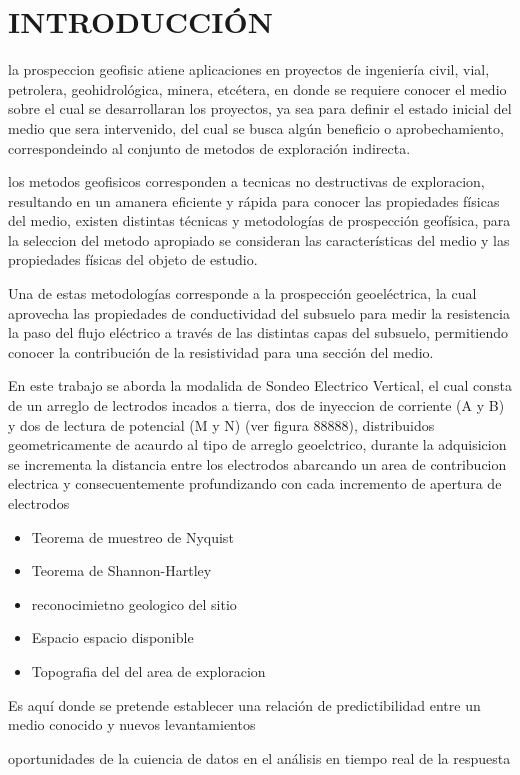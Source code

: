 \chapter{INTRODUCCIÓN}
la prospeccion geofisic atiene aplicaciones en proyectos de ingeniería civil, vial, petrolera, geohidrológica, minera, etcétera, en donde se requiere conocer el medio sobre el cual se desarrollaran los proyectos, ya sea para definir el estado inicial del medio que sera intervenido, del cual se busca algún beneficio o aprobechamiento, correspondeindo al conjunto de metodos  de exploración indirecta.

los metodos geofisicos corresponden a tecnicas no destructivas de exploracion, resultando en un amanera eficiente y rápida para conocer las propiedades físicas del medio, existen distintas técnicas y metodologías de prospección geofísica,  para la seleccion del metodo apropiado se consideran las características del medio y las propiedades físicas del objeto de estudio.

Una de estas metodologías corresponde a la prospección geoeléctrica, la cual aprovecha las propiedades de conductividad del subsuelo para medir la resistencia la paso del flujo eléctrico a través de las distintas capas del subsuelo, permitiendo conocer la contribución de la resistividad para una sección del medio.

En este trabajo se aborda la modalida de Sondeo Electrico Vertical, el cual consta de un arreglo de lectrodos incados a tierra, dos de inyeccion de corriente (A y B) y dos de lectura de potencial (M y N) (ver figura 88888), distribuidos geometricamente de acaurdo al tipo de arreglo geoelctrico, durante la adquisicion se incrementa la distancia entre los electrodos abarcando un area de contribucion electrica y consecuentemente profundizando con cada incremento de apertura de electrodos



\begin{itemize}
	\item Teorema de muestreo de Nyquist
	\item Teorema de Shannon-Hartley
	\item reconocimietno geologico del sitio 
	\item Espacio espacio disponible
	\item Topografia del del area de exploracion
\end{itemize}





Es aquí donde se pretende establecer una relación de predictibilidad entre un medio conocido y nuevos levantamientos
 


oportunidades de la cuiencia de datos en el análisis en tiempo real de la respuesta 



